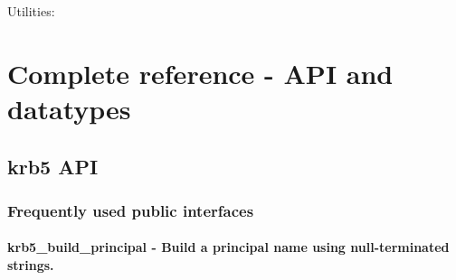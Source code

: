 \documentclass[letterpaper,10pt,english]{sphinxmanual}
\begin{document}
Utilities:

{\hyperref[appdev/refs/api/krb5_is_config_principal:krb5_is_config_principal]{}}

{\hyperref[appdev/refs/api/krb5_kuserok:krb5_kuserok]{}}

{\hyperref[appdev/refs/api/krb5_set_password:krb5_set_password]{}}

{\hyperref[appdev/refs/api/krb5_set_password_using_ccache:krb5_set_password_using_ccache]{}}

{\hyperref[appdev/refs/api/krb5_set_principal_realm:krb5_set_principal_realm]{}}

{\hyperref[appdev/refs/api/krb5_realm_compare:krb5_realm_compare]{}}


\chapter{Complete reference - API and datatypes}
\label{appdev/refs/index:complete-reference-api-and-datatypes}\label{appdev/refs/index::doc}

\section{krb5 API}
\label{appdev/refs/api/index:krb5-api}\label{appdev/refs/api/index::doc}

\subsection{Frequently used public interfaces}
\label{appdev/refs/api/index:frequently-used-public-interfaces}

\subsubsection{krb5\_build\_principal -  Build a principal name using null-terminated strings.}
\label{appdev/refs/api/krb5_build_principal:krb5-build-principal-build-a-principal-name-using-null-terminated-strings}\label{appdev/refs/api/krb5_build_principal::doc}

\begin{fulllineitems}
\label{appdev/refs/api/krb5_build_principal:krb5_build_principal}
\end{fulllineitems}
\end{document}

